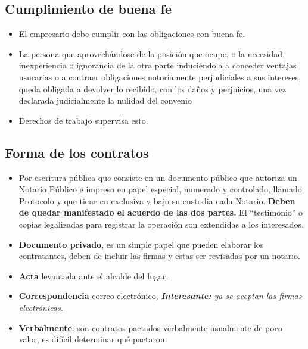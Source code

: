 \documentclass{article}
\begin{document}
\subsection{Cumplimiento de buena fe}
\begin{itemize}
    \item El empresario debe cumplir con las obligaciones con buena fe.
    \item La persona que aprovechándose de la posición que ocupe, o la necesidad, inexperiencia o ignorancia de la otra parte induciéndola a conceder ventajas usurarias o a contraer obligaciones notoriamente perjudiciales a sus intereses, queda obligada a devolver lo recibido, con los daños y perjuicios, una vez declarada judicialmente la nulidad del convenio
    \item Derechos de trabajo supervisa esto.
\end{itemize}

\subsection{Forma de los contratos}
\begin{itemize}
    \item  Por escritura pública que consiste en un documento público que autoriza un Notario Público e impreso en papel especial, numerado y controlado, llamado Protocolo y que tiene en exclusiva y bajo su custodia cada Notario. \textbf{Deben de quedar manifestado el acuerdo de las dos partes.} El ``testimonio'' o copias legalizadas para registrar la operación son extendidas a los interesados.
    \item \textbf{Documento privado}, es un simple papel que pueden elaborar los contratantes, deben de incluir las firmas y estas ser revisadas por un notario.
    \item \textbf{Acta} levantada ante el alcalde del lugar.
    \item \textbf{Correspondencia} correo electrónico, \emph{\textbf{Interesante:} ya se aceptan las firmas electrónicas.} 
    \item \textbf{Verbalmente}: son contratos pactados verbalmente usualmente de poco valor, es difícil determinar qué pactaron. 
\end{itemize}
\end{document}
